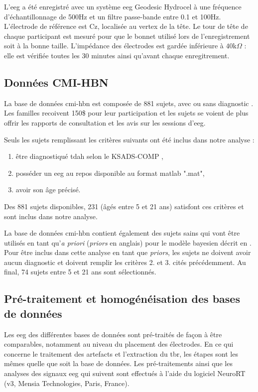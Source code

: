 L'\gls{eeg} a été enregistré avec un système \gls{eeg} Geodesic Hydrocel à une fréquence d'échantillonnage de 500Hz et un filtre passe-bande entre 0.1 et 100Hz. 
L'électrode de référence est Cz, localisée au vertex de la tête. Le tour de tête de chaque participant est mesuré pour que le bonnet utilisé lors de l'enregistrement 
soit à la bonne taille. L'impédance des électrodes est gardée inférieure à $40$k$\Omega$ : elle est vérifiée toutes les 30 minutes ainsi qu'avant chaque enregitrement.

\subsection{Données CMI-HBN}
La base de données \gls{cmi-hbn} est composée de 881 sujets, avec ou sans diagnostic \citep{Alexander2017, Alexander2017b}. Les familles recoivent 150\$ pour leur participation 
et les sujets se voient de plus offrir les rapports de consultation et les avis sur les sessions d'\gls{eeg}.

Seuls les sujets remplissant les critères suivants ont été inclus dans notre analyse :
\begin{enumerate}
\item être diagnostiqué \gls{tdah} selon le KSADS-COMP \citep{Kaufman1997},
\item posséder un \gls{eeg} au repos disponible au format matlab ".mat",
\item avoir son âge précisé.
\end{enumerate}

Des 881 sujets disponibles, 231 (âgés entre 5 et 21 ans) satisfont ces critères et sont inclus dans notre analyse.

La base de données \gls{cmi-hbn} contient également des sujets sains qui vont être utilisés en tant qu'\textit{a priori} (\textit{priors} en anglais) pour le
modèle bayesien décrit en \label{clustering}. Pour être inclus dans cette analyse en tant que \textit{priors}, les sujets ne doivent avoir aucun diagnostic 
et doivent remplir les critères 2. et 3. cités précédemment. Au final, 74 sujets entre 5 et 21 ans sont sélectionnés. 

\subsection{Pré-traitement et homogénéisation des bases de données} \label{pré-traitement TBR}
Les \gls{eeg} des différentes bases de données sont pré-traités de façon à être comparables, notamment au niveau du placement des électrodes.
En ce qui concerne le traitement des artefacts et l'extraction du \gls{tbr}, les étapes sont les mêmes quelle que soit la base de données. 
Les pré-traitements ainsi que les analyses des signaux \gls{eeg} qui suivent sont effectués à l'aide du logiciel NeuroRT (v3, Mensia Technologies, 
Paris, France).


